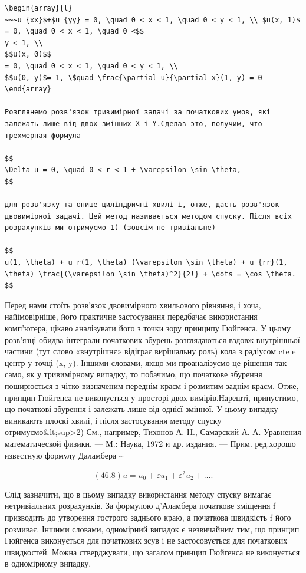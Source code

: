 \documentclass[
  ukrainian,
]{article}
\begin{document}
\begin{verbatim}
\begin{array}{l}
~~~u_{xx}$+$u_{yy} = 0, \quad 0 < x < 1, \quad 0 < y < 1, \\ $u(x, 1)$ = 0, \quad 0 < x < 1, \quad 0 <$$
y < 1, \\
$$u(x, 0)$$
= 0, \quad 0 < x < 1, \quad 0 < y < 1, \\
$$u(0, y)$= 1, \$quad \frac{\partial u}{\partial x}(1, y) = 0 \end{array}

Розглянемо розв'язок тривимірної задачі за початкових умов, які залежать лише від двох змінних X і Y.Сделав это, получим, что трехмерная формула

$$
\Delta u = 0, \quad 0 < r < 1 + \varepsilon \sin \theta,
$$

для розв'язку та опише циліндричні хвилі і, отже, дасть розв'язок двовимірної задачі. Цей метод називається методом спуску. Після всіх розрахунків ми отримуємо 1) (зовсім не тривіальне)

$$
u(1, \theta) + u_r(1, \theta) (\varepsilon \sin \theta) + u_{rr}(1, \theta) \frac{(\varepsilon \sin \theta)^2}{2!} + \dots = \cos \theta.
$$
\end{verbatim}

Перед нами стоїть розв'язок двовимірного хвильового рівняння, і хоча,
найімовірніше, його практичне застосування передбачає використання
комп'ютера, цікаво аналізувати його з точки зору принципу Гюйгенса. У
цьому розв'язці обидва інтеграли початкових збурень розглядаються вздовж
внутрішньої частини (тут слово «внутрішнє» відіграє вирішальну роль)
кола з радіусом cte e центр у точці (x, y). Іншими словами, якщо ми
проаналізуємо це рішення так само, як у тривимірному випадку, то
побачимо, що початкове збурення поширюється з чітко визначеним переднім
краєм і розмитим заднім краєм. Отже, принцип Гюйгенса не виконується у
просторі двох вимірів.Нарешті, припустимо, що початкові збурення \phi  і
\phi  залежать лише від однієї змінної. У цьому випадку виникають плоскі
хвилі, і після застосування методу спуску
отримуємо\&lt;sup\textgreater2) См., например, Тихонов А. Н., Самарский
А. А. Уравнения математической физики. --- М.: Наука, 1972 и др.
издания. --- Прим. ред.хорошо известную формулу Даламбера
\textsubscript{}\textasciitilde{}

\[
(46.8) u = u_0 + \varepsilon u_1 + \varepsilon^2 u_2 + \dots.
\]

Слід зазначити, що в цьому випадку використання методу спуску вимагає
нетривіальних розрахунків. За формулою д'Аламбера початкове зміщення f
призводить до утворення гострого заднього краю, а початкова швидкість f
його розмиває. Іншими словами, одномірний випадок є незвичайним тим, що
принцип Гюйгенса виконується для початкових зсув і не застосовується для
початкових швидкостей. Можна стверджувати, що загалом принцип Гюйгенса
не виконується в одномірному випадку.
\end{document}
